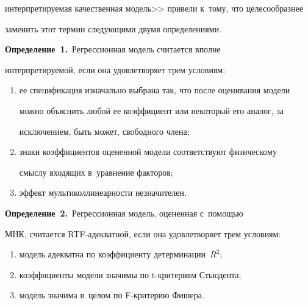 интерпретируемая качественная модель>> привели к~тому, что целесообразнее 


заменить этот термин следующими двумя определениями.


  \smallskip


  


  \noindent


  \textbf{Определение~1.}\ Регрессионная модель считается вполне 


интерпретируемой, если она удовлетворяет трем условиям:


  \begin{enumerate}[(1)]


\item ее спецификация изначально выбрана так, что после оценивания модели 


можно объяснить любой ее коэффициент или некоторый его аналог, за 


исключением, быть может, свободного члена;


\item знаки коэффициентов оцененной модели соответствуют физическому 


смыслу входящих в~уравнение факторов;


\item эффект мультиколлинеарности незначителен.


\end{enumerate}





  \noindent


  \textbf{Определение~2.}\  Регрессионная модель, оцененная с~помощью 


МНК, считается RTF-адекват\-ной, если она удовлетворяет трем условиям:


  \begin{enumerate}[(1)]


\item модель адекватна по коэффициенту детерминации~$R^2$;


\item коэффициенты модели значимы по t-кри\-те\-ри\-ям Стьюдента;


\item модель значима в~целом по F-кри\-те\-рию Фишера.


\end{enumerate}






